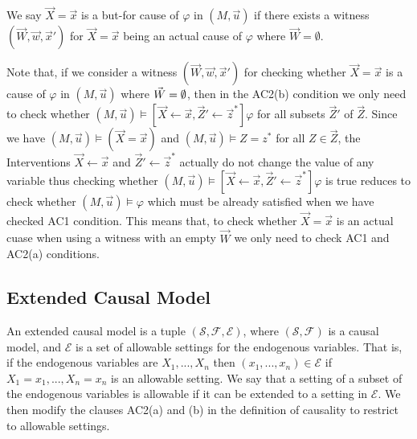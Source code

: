 \begin{definition}
    We say $\vec X = \vec x$ is a but-for cause of $\varphi$ in
    $(M,\vec u)$ if there exists a witness $(\vec W, \vec w, \vec x')$
    for $\vec X = \vec x$ being an actual cause of $\varphi$
    where $\vec W = \emptyset $.
\end{definition}

Note that, if we consider a witness $(\vec W, \vec w, \vec x')$
for checking whether $\vec X = \vec x$ is a cause of $\varphi$
in $(M,\vec u)$ where $\vec W = \emptyset$, then in the AC2(b) condition
we only need to check whether $(M,\vec u) \vDash [\vec X \leftarrow \vec x, \vec Z' \leftarrow \vec z^*]\varphi$ for all subsets $\vec Z'$
of $\vec Z$.
Since we have $(M,\vec u) \vDash (\vec X = \vec x)$ and
$(M,\vec u) \vDash Z = z^*$ for all $Z \in \vec Z$,
the Interventions $\vec X \leftarrow \vec x$ and
$\vec Z ' \leftarrow \vec z^*$ actually do not change the value of
any variable thus checking whether
$(M,\vec u) \vDash [\vec X \leftarrow \vec x, \vec Z' \leftarrow \vec z^*]\varphi$ is true
reduces to check whether $(M,\vec u) \vDash \varphi$
which must be already satisfied when we have checked AC1 condition.
This means that, to check whether $\vec X = \vec x$ is an actual cuase when using a witness with an empty $\vec W$
we only need to check AC1 and AC2(a) conditions.
\subsection{Extended Causal Model}
An extended causal model is a tuple $(\mathcal{S},\mathcal{F},
    \mathcal{E})$, where $(\mathcal{S},\mathcal{F})$ is a causal model, and $\mathcal{E}$ is a set of allowable settings for the endogenous variables.
That is, if the endogenous variables are $X_1,...,X_n$ then
$(x_1,...,x_n) \in \mathcal{E}$ if $X_1 = x_1, ..., X_n=x_n$ is an
allowable setting.
We say that a setting of a subset of the endogenous variables is allowable if it can be extended to a setting in $\mathcal{E}$.
We then modify the clauses AC2(a) and (b) in the definition of causality to restrict to allowable settings.

